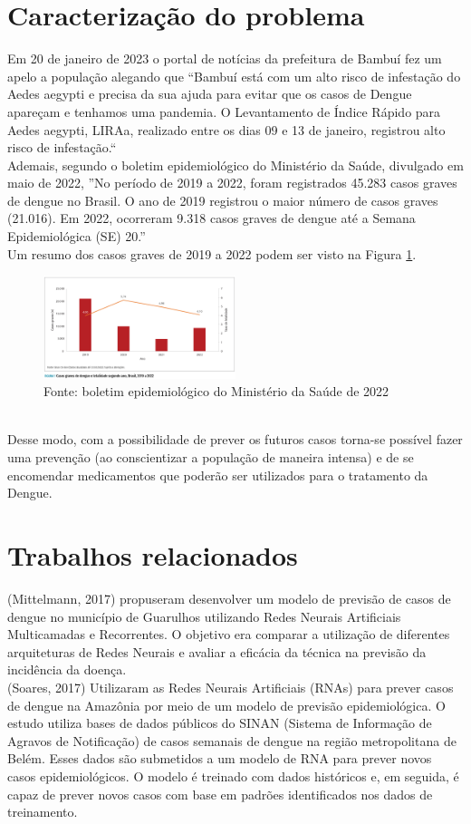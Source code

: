 \documentclass[
	article,			%
	12pt,				%
	a4paper,			%
	chapter=TITLE,		%
	section=TITLE,		%
	subsection=TITLE,	%
	subsubsection=TITLE %
	english,			%
	brazil,				%
	sumario=tradicional
	]{abntex2}
\begin{document}
\section{Caracterização do problema}
 Em 20 de janeiro de 2023 o portal de notícias da prefeitura de Bambuí fez um apelo a população alegando que 
“Bambuí está com um alto risco de infestação do Aedes aegypti e precisa da sua ajuda para evitar que os casos de Dengue apareçam e tenhamos uma pandemia.
 O Levantamento de Índice Rápido para Aedes aegypti, LIRAa, realizado entre os dias 09 e 13 de janeiro, registrou alto risco de infestação.“
 \\ \indent
 Ademais, segundo o boletim epidemiológico do Ministério da Saúde, divulgado em maio de 2022, 
 ”No período de 2019 a 2022, foram registrados 45.283 casos graves de dengue no
 Brasil. O ano de 2019 registrou o maior número de casos graves (21.016). Em 2022,
 ocorreram 9.318 casos graves de dengue até a Semana Epidemiológica (SE) 20.”
\\ \indent Um resumo dos casos graves de 2019 a 2022 podem ser visto na Figura \ref{figure1}.
\begin{figure}[htbp]
	\centering
	\includegraphics[width=0.5\textwidth]{imagens/graficoDengueMS.png}
	\caption{Fonte: boletim epidemiológico do Ministério da Saúde de 2022}
	\label{figure1}
\end{figure}
\\Desse modo, com a possibilidade de prever os futuros casos torna-se possível fazer uma prevenção (ao conscientizar a população de maneira intensa) e de se encomendar medicamentos que poderão ser utilizados para o tratamento da Dengue.
\section{Trabalhos  relacionados}
(Mittelmann, 2017) propuseram desenvolver um modelo de previsão de casos de dengue no município de Guarulhos utilizando Redes Neurais Artificiais Multicamadas e Recorrentes. O objetivo era comparar a utilização de diferentes arquiteturas de Redes Neurais e avaliar a eficácia da técnica na previsão da incidência da doença. 
\\ \indent
(Soares, 2017) Utilizaram as Redes Neurais Artificiais (RNAs) para prever casos de dengue na Amazônia por meio de um modelo de previsão epidemiológica. O estudo utiliza bases de dados públicos do SINAN (Sistema de Informação de Agravos de Notificação) de casos semanais de dengue na região metropolitana de Belém. Esses dados são submetidos a um modelo de RNA para prever novos casos epidemiológicos. O modelo é treinado com dados históricos e, em seguida, é capaz de prever novos casos com base em padrões identificados nos dados de treinamento. 
\end{document}
